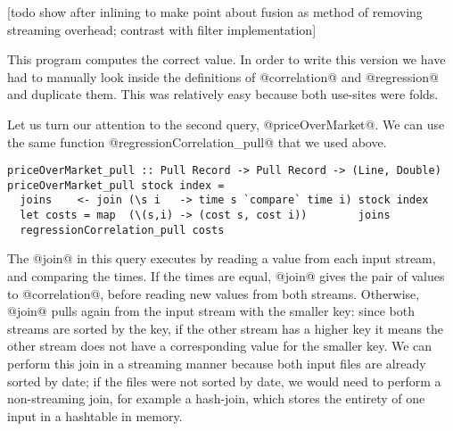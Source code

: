 [todo show after inlining to make point about fusion as method of removing streaming overhead; contrast with filter implementation]

This program computes the correct value.
In order to write this version we have had to manually look inside the definitions of @correlation@ and @regression@ and duplicate them.
This was relatively easy because both use-sites were folds.


Let us turn our attention to the second query, @priceOverMarket@.
We can use the same function @regressionCorrelation_pull@ that we used above.

\begin{lstlisting}
priceOverMarket_pull :: Pull Record -> Pull Record -> (Line, Double)
priceOverMarket_pull stock index =
  joins    <- join (\s i   -> time s `compare` time i) stock index
  let costs = map  (\(s,i) -> (cost s, cost i))        joins
  regressionCorrelation_pull costs
\end{lstlisting}


The @join@ in this query executes by reading a value from each input stream, and comparing the times.
If the times are equal, @join@ gives the pair of values to @correlation@, before reading new values from both streams.
Otherwise, @join@ pulls again from the input stream with the smaller key: since both streams are sorted by the key, if the other stream has a higher key it means the other stream does not have a corresponding value for the smaller key.
We can perform this join in a streaming manner because both input files are already sorted by date; if the files were not sorted by date, we would need to perform a non-streaming join, for example a hash-join, which stores the entirety of one input in a hashtable in memory.

